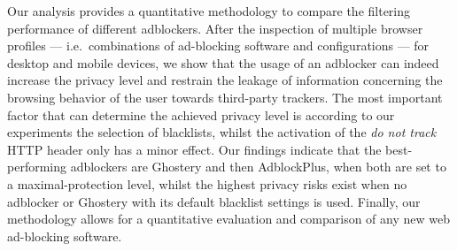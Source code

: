 \documentclass[compsoc, conference, letterpaper, 10pt, times]{IEEEtran}
\begin{document}
Our analysis provides a quantitative methodology to compare the filtering performance of different adblockers. After the inspection of multiple browser profiles --- i.e.\ combinations of ad-blocking software and configurations --- for desktop and mobile devices, we show that the usage of an adblocker can indeed increase the privacy level and restrain the leakage of information concerning the browsing behavior of the user towards third-party trackers. The most important factor that can determine the achieved privacy level is according to our experiments the selection of blacklists, whilst the activation of the \textit{do not track} HTTP header only has a minor effect. Our findings indicate that the best-performing adblockers are Ghostery and then AdblockPlus, when both are set to a maximal-protection level, whilst the highest privacy risks exist when no adblocker or Ghostery with its default blacklist settings is used. Finally, our methodology allows for a quantitative evaluation and comparison of any new web ad-blocking software.


\end{document}
